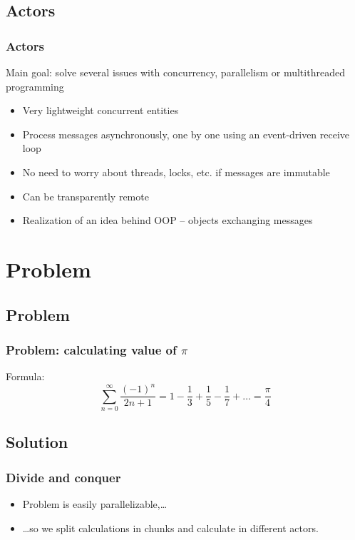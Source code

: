 \documentclass[xcolor=dvipsnames]{beamer}
\begin{document}
\subsection{Actors}

\begin{frame}
\frametitle{Actors}
Main goal: solve several issues with concurrency, parallelism or multithreaded programming
\begin{itemize}
\item Very lightweight concurrent entities
\item Process messages asynchronously, one by one using an event-driven receive loop
\item No need to worry about threads, locks, etc. if messages are immutable
\item Can be transparently remote
\item Realization of an idea behind OOP -- objects exchanging messages
\end{itemize}
\end{frame}


\section{Problem}

\subsection{Problem}

\begin{frame}
\frametitle{Problem: calculating value of $\pi$}
Formula:
\[\sum_{n=0}^\infty \frac{(-1)^n}{2n+1} = 1 - \frac{1}{3} + \frac{1}{5} - \frac{1}{7} + \ldots = \frac{\pi}{4}\]
\end{frame}

\subsection{Solution}

\begin{frame}
\frametitle{Divide and conquer}
\begin{itemize}
\item Problem is easily parallelizable,\ldots
\item \ldots{}so we split calculations in chunks and calculate in different actors.
\end{itemize}
\end{frame}
\end{document}
